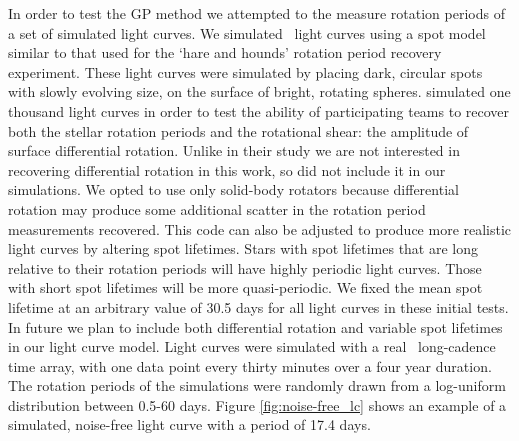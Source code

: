 In order to test the GP method we attempted to the measure rotation periods of
a set of simulated light curves.
We simulated \nlightcurves\ light curves using a spot model similar to that
used
for the \citet{Aigrain2015} `hare and hounds' rotation period recovery
experiment.
These light curves were simulated by placing dark, circular spots with slowly
evolving size, on the surface of bright, rotating spheres.
\citet{Aigrain2015} simulated one thousand light curves in order to test the
ability of participating teams to recover both the stellar rotation periods
and the rotational shear: the amplitude of surface differential rotation.
Unlike in their study we are not interested in recovering differential
rotation in this work, so did not include it in our simulations.
We opted to use only solid-body rotators because differential rotation may
produce some additional scatter in the rotation period measurements recovered.
This code can also be adjusted to produce more realistic light curves by
altering spot lifetimes.
Stars with spot lifetimes that are long relative to their rotation periods
will have highly periodic light curves.
Those with short spot lifetimes will be more quasi-periodic.
We fixed the mean spot lifetime at an arbitrary value of 30.5 days for all
light curves in these initial tests.
In future we plan to include both differential rotation and variable spot
lifetimes in our light curve model.
Light curves were simulated with a real \Kepler\ long-cadence time array, with
one data point every thirty minutes over a four year duration.
The rotation periods of the simulations were randomly drawn from a log-uniform
distribution between 0.5-60 days.
Figure \ref{fig:noise-free_lc} shows an example of a simulated, noise-free
light curve with a period of 17.4 days.


